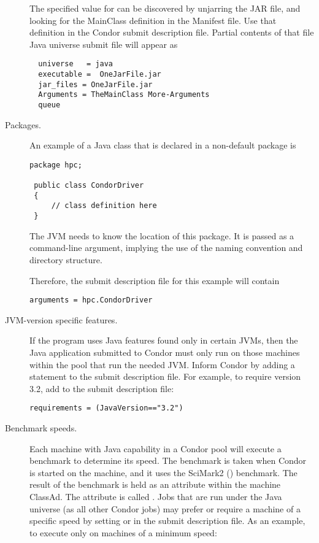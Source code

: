 \begin{description}
The specified value for \verb@TheMainClass@
can be discovered by unjarring the JAR file,
and looking for the MainClass definition in the Manifest file.
Use that definition in the Condor submit description file.
Partial contents of that file Java universe submit file will appear as

\begin{verbatim}
  universe   = java
  executable =  OneJarFile.jar
  jar_files = OneJarFile.jar
  Arguments = TheMainClass More-Arguments
  queue 
\end{verbatim}


\item[Packages.]
An example of a Java class that is declared in a non-default
package is
\begin{verbatim}
package hpc;

 public class CondorDriver
 {
     // class definition here
 }
\end{verbatim}
The JVM needs to know the location of this package.
It is passed as a command-line argument, implying the use
of the naming convention and directory structure.

Therefore, the submit description file for this example will contain
\begin{verbatim}
arguments = hpc.CondorDriver
\end{verbatim}

\item[JVM-version specific features.]
If the program uses Java features found only in certain
JVMs, then the Java application submitted to Condor
must only run on those machines within the
pool that run the needed JVM.
Inform Condor by adding a 
statement to the submit description file.
For example, to require version 3.2, add to the submit description
file:

\begin{verbatim}
requirements = (JavaVersion=="3.2")
\end{verbatim}

\item[Benchmark speeds.]
Each machine with Java capability in a Condor pool
will execute a benchmark to determine its speed.
The benchmark is taken when Condor is started on
the machine, and it uses the SciMark2
() benchmark.
The result of the benchmark is held as an attribute
within the 
machine ClassAd.
The attribute is called .
Jobs that are run under the Java universe (as all other Condor jobs)
may prefer or require a machine of a specific speed
by setting  or  in
the submit description file.
As an example, to execute only on machines of a minimum speed:


\end{description}
